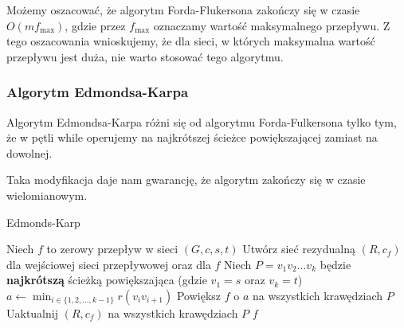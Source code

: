 Możemy oszacować, że algorytm Forda-Flukersona 
zakończy się w czasie $O(mf_{\max})$, gdzie 
przez $f_{\max}$ oznaczamy wartość maksymalnego przepływu. 
Z tego oszacowania wnioskujemy, że dla sieci, w których
maksymalna wartość przepływu jest duża, 
nie warto stosować tego algorytmu. 

\subsubsection{Algorytm Edmondsa-Karpa}
Algorytm Edmondsa-Karpa różni się od 
algorytmu Forda-Fulkersona tylko tym, że
w pętli while operujemy na najkrótszej ścieżce powiększającej
zamiast na dowolnej.

Taka modyfikacja daje nam gwarancję, że
algorytm zakończy się w czasie wielomianowym.

\begin{algorithm}[H]
	\caption{Edmonds-Karp}\label{edmonds-karp_alg}
	\begin{algorithmic}[1]
		\State Niech $f$ to zerowy przepływ w sieci $(G,c,s,t)$
		\State Utwórz sieć rezydualną $(R, c_f)$ dla wejściowej 
		sieci przepływowej oraz dla $f$ 
		\State Niech $P = v_1v_2\dots v_k$ będzie \textbf{najkrótszą}
		ścieżką powiększająca (gdzie $v_1 = s$ oraz $v_k = t$)
		\State $a \gets \min_{i \in \{1, 2, \dots, k-1\}} r(v_iv_{i+1})$
		\State Powiększ $f$ o $a$ na wszystkich krawędziach $P$
		\State Uaktualnij $(R, c_f)$ na wszystkich krawędziach $P$
		\EndWhile
		\State \Return $f$
		\EndProcedure
	\end{algorithmic}
\end{algorithm}



